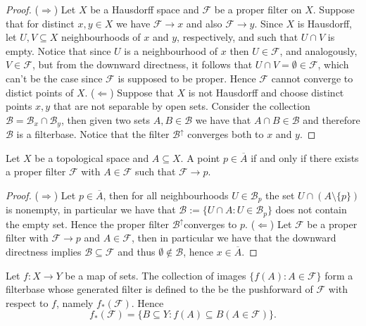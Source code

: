 \begin{proof}
  (\(\Rightarrow\)) Let \(X\) be a Hausdorff space and \(\mathcal F\) be a
  proper filter on \(X\). Suppose that for distinct \(x, y \in X\) we have
  \(\mathcal F \to x\) and also \(\mathcal F \to y\). Since \(X\) is Hausdorff,
  let \(U, V \subseteq X\) neighbourhoods of \(x\) and \(y\), respectively, and
  such that \(U \cap V\) is empty. Notice that since \(U\) is a neighbourhood of
  \(x\) then \(U \in \mathcal F\), and analogously, \(V \in \mathcal F\), but
  from the downward directness, it follows that \(U \cap V = \emptyset \in
  \mathcal F\), which can't be the case since \(\mathcal F\) is supposed to be
  proper. Hence \(\mathcal F\) cannot converge to distict points of \(X\).
  (\(\Leftarrow\)) Suppose that \(X\) is not Hausdorff and choose distinct
  points \(x, y\) that are not separable by open sets. Consider the collection
  \(\mathcal B = \mathcal B_x \cap \mathcal B_y\), then given two sets \(A, B
  \in \mathcal B\) we have that \(A \cap B \in \mathcal B\) and therefore
  \(\mathcal B\) is a filterbase. Notice that the filter \(\mathcal B^\uparrow\)
  converges both to \(x\) and \(y\).
\end{proof}

\begin{proposition}[Closed]\label{prop: closed from filter}
  Let \(X\) be a topological space and \(A \subseteq X\). A point \(p \in
  \overline A\) if and only if there exists a proper filter \(\mathcal F\) with
  \(A \in \mathcal F\) such that \(\mathcal F \to p\).
\end{proposition}

\begin{proof}
  (\(\Rightarrow\)) Let \(p \in \overline A\), then for all neighbourhoods \(U
  \in \mathcal B_p\) the set \(U \cap (A \setminus \{p\})\) is nonempty, in
  particular we have that \(\mathcal B := \{U \cap A : U \in \mathcal B_p\}\)
  does not contain the empty set. Hence the proper filter \(\mathcal
  B^\uparrow\)converges to \(p\). (\(\Leftarrow\)) Let \(\mathcal F\) be a
  proper filter with \(\mathcal F \to p\) and \(A \in \mathcal F\), then in
  particular we have that the downward directness implies \(\mathcal B \subseteq
  \mathcal F\) and thus \(\emptyset \not\in \mathcal B\), hence \(x \in
  \overline A\).
\end{proof}

\begin{definition}\label{def: pushforward of filters}
  Let \(f: X \to Y\) be a map of sets. The collection of images \(\{f(A) : A \in
  \mathcal F\}\) form a filterbase whose generated filter is defined to the be
  the pushforward of \(\mathcal F\) with respect to \(f\), namely
  \(f_\ast(\mathcal F)\). Hence
  \[
    f_\ast(\mathcal F) = \{B \subseteq Y : f(A) \subseteq B (A \in \mathcal
    F)\}.
  \]
\end{definition}

